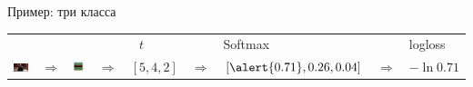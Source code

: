 \documentclass[notes,12pt, aspectratio=169]{beamer}
\begin{document}
\begin{frame}{Пример: три класса}
\begin{tabular}{m{2.5cm} m{0.35cm} m{1.8cm} m{0.35cm} m{1cm} m{0.35cm} m{2.7cm} m{0.5cm} m{1.5cm}}

& & & &  {\large  $\mbox{ }t$ } &  &  {\large \hspace{5pt} Softmax} &  &  {\large  logloss} \\
\includegraphics[scale=0.2]{tab_cat.png} & {\Large $\Rightarrow$} & \includegraphics[scale=0.2]{tab_nn.png}  &  {\Large $\Rightarrow$} &  $[5, 4, 2]$ &  {\Large $\Rightarrow$} &  $[\alert{0.71}, 0.26, 0.04]$ & {\Large $\Rightarrow$}  & $-\ln 0.71$\\


\end{tabular}
\end{frame}
\end{document}
